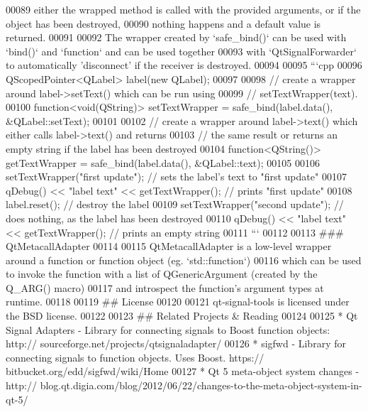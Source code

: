 \begin{DoxyCode}
00089 \textcolor{stringliteral}{either the wrapped method is called with the provided arguments, or if the object has been destroyed,}
00090 \textcolor{stringliteral}{nothing happens and a default value is returned.}
00091 \textcolor{stringliteral}{}
00092 \textcolor{stringliteral}{The wrapper created by `safe\_bind()` can be used with `bind()` and `function` and can be used together}
00093 \textcolor{stringliteral}{with `QtSignalForwarder` to automatically '}disconnect\textcolor{stringliteral}{' if the receiver is destroyed.}
00094 \textcolor{stringliteral}{}
00095 \textcolor{stringliteral}{```cpp}
00096 \textcolor{stringliteral}{QScopedPointer<QLabel> label(new QLabel);}
00097 \textcolor{stringliteral}{}
00098 \textcolor{stringliteral}{// create a wrapper around label->setText() which can be run using}
00099 \textcolor{stringliteral}{// setTextWrapper(text).}
00100 \textcolor{stringliteral}{function<void(QString)> setTextWrapper = safe\_bind(label.data(), &QLabel::setText);}
00101 \textcolor{stringliteral}{}
00102 \textcolor{stringliteral}{// create a wrapper around label->text() which either calls label->text() and returns}
00103 \textcolor{stringliteral}{// the same result or returns an empty string if the label has been destroyed}
00104 \textcolor{stringliteral}{function<QString()> getTextWrapper = safe\_bind(label.data(), &QLabel::text);}
00105 \textcolor{stringliteral}{}
00106 \textcolor{stringliteral}{setTextWrapper("first update"); // sets the label'}s text to \textcolor{stringliteral}{"first update"}
00107 qDebug() << \textcolor{stringliteral}{"label text"} << getTextWrapper(); \textcolor{comment}{// prints "first update"}
00108 label.reset(); \textcolor{comment}{// destroy the label}
00109 setTextWrapper(\textcolor{stringliteral}{"second update"}); \textcolor{comment}{// does nothing, as the label has been destroyed}
00110 qDebug() << \textcolor{stringliteral}{"label text"} << getTextWrapper(); \textcolor{comment}{// prints an empty string}
00111 ```
00112 
00113 \textcolor{preprocessor}{### QtMetacallAdapter}
00114 \textcolor{preprocessor}{}
00115 QtMetacallAdapter is a low-level wrapper around a \textcolor{keyword}{function} or \textcolor{keyword}{function} object (eg. `std::function`)
00116 which can be used to invoke the function with a list of QGenericArgument (created by the Q\_ARG() macro)
00117 and introspect the function's argument types at runtime.
00118 
00119 \textcolor{preprocessor}{## License}
00120 \textcolor{preprocessor}{}
00121 qt-signal-tools is licensed under the BSD license.
00122 
00123 ## Related Projects & Reading
00124 
00125  * Qt Signal Adapters - Library \textcolor{keywordflow}{for} connecting signals to Boost \textcolor{keyword}{function} objects: http:\textcolor{comment}{//
      sourceforge.net/projects/qtsignaladapter/}
00126  * sigfwd - Library \textcolor{keywordflow}{for} connecting signals to \textcolor{keyword}{function} objects.  Uses Boost. https:\textcolor{comment}{//
      bitbucket.org/edd/sigfwd/wiki/Home}
00127  * Qt 5 meta-\textcolor{keywordtype}{object} system changes - http:\textcolor{comment}{//
      blog.qt.digia.com/blog/2012/06/22/changes-to-the-meta-object-system-in-qt-5/}
\end{DoxyCode}
